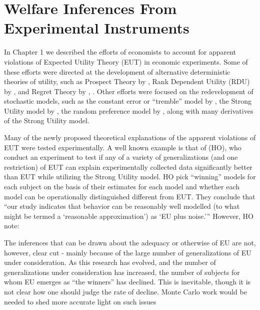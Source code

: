 \documentclass[../main.tex]{subfiles}
\begin{document}
\doublespacing
\setcounter{chapter}{3}

\chapter{Welfare Inferences From Experimental Instruments}

\lltoc %

In Chapter 1 we described the efforts of economists to account for apparent violations of Expected Utility Theory (EUT) in economic experiments.
Some of these efforts were directed at the development of alternative deterministic theories of utility, such as Prospect Theory by \textcite{Kahneman1979}, Rank Dependent Utility (RDU) by \textcite{Quiggin1982}, and Regret Theory by \textcite{Bell1982}, \textcite{Loomes1982}.
Other efforts were focused on the redevelopment of stochastic models, such as the constant error or \enquote{tremble} model by \textcite{Harless1994}, the Strong Utility model by \textcite{Hey1994}, the random preference model by \textcite{Loomes1995}, along with many derivatives of the Strong Utility model.

Many of the newly proposed theoretical explanations of the apparent violations of EUT were tested experimentally.
A well known example is that of \textcite{Hey1994} (HO), who conduct an experiment to test if any of a variety of generalizations (and one restriction) of EUT can explain experimentally collected data significantly better than EUT while utilizing the Strong Utility model.
HO pick \enquote{winning} models for each subject on the basis of their estimates for each model and whether each model can be operationally distinguished different from EUT.
They conclude that \enquote{our study indicates that behavior can be reasonably well modelled (to what might be termed a \enquote{reasonable approximation}) as \enquote{EU plus noise.}}
However, HO note:

\singlespacing
\begin{displayquote}
The inferences that can be drawn \textelp{} about the adequacy or otherwise of EU are not, however, clear cut - mainly because of the large number of generalizations of EU under consideration.
As this research has evolved, and the number of generalizations under consideration has increased, the number of subjects for whom EU emerges as \enquote{the winners} has declined.
This is inevitable, though it is not clear how one should judge the rate of decline.
\textelp{} Monte Carlo work would be needed to shed more accurate light on such issues
\end{displayquote}
\doublespacing
\end{document}
